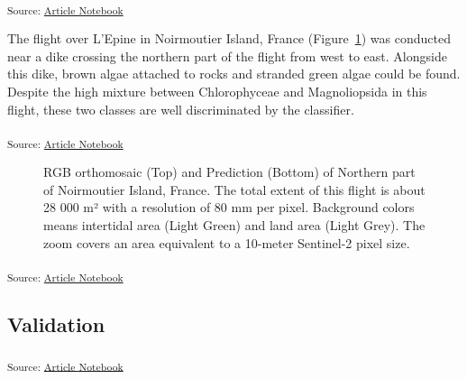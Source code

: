 \documentclass[
  number]{elsarticle}
\begin{document}
\textsubscript{Source:
\href{https://SigOiry.github.io/Drone_Paper_2023/index.qmd.html}{Article
Notebook}}

The flight over L'Epine in Noirmoutier Island, France
(Figure~\ref{fig-Dike}) was conducted near a dike crossing the northern
part of the flight from west to east. Alongside this dike, brown algae
attached to rocks and stranded green algae could be found. Despite the
high mixture between Chlorophyceae and Magnoliopsida in this flight,
these two classes are well discriminated by the classifier.

\textsubscript{Source:
\href{https://SigOiry.github.io/Drone_Paper_2023/index.qmd.html}{Article
Notebook}}

\label{cell-fig-Dike}
\begin{figure}[H]


\caption{\label{fig-Dike}RGB orthomosaic (Top) and Prediction (Bottom)
of Northern part of Noirmoutier Island, France. The total extent of this
flight is about 28 000 m² with a resolution of 80 mm per pixel.
Background colors means intertidal area (Light Green) and land area
(Light Grey). The zoom covers an area equivalent to a 10-meter
Sentinel-2 pixel size.}

\end{figure}%

\textsubscript{Source:
\href{https://SigOiry.github.io/Drone_Paper_2023/index.qmd.html}{Article
Notebook}}

\subsection{Validation}\label{validation-1}

\textsubscript{Source:
\href{https://SigOiry.github.io/Drone_Paper_2023/index.qmd.html}{Article
Notebook}}
\end{document}
